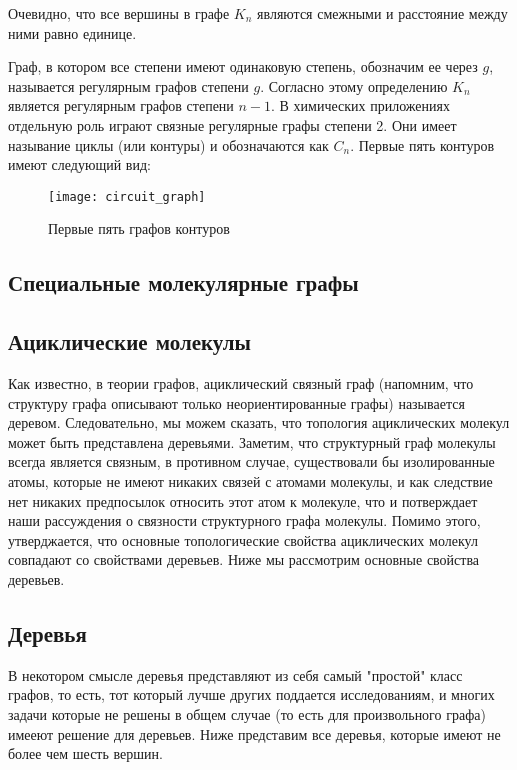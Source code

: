 \documentclass{article}
\begin{document}
Очевидно, что все вершины в графе $K_n$ являются смежными и расстояние между ними равно единице.

Граф, в котором все степени имеют одинаковую степень, обозначим ее через $g$, называется регулярным графов степени $g$. Согласно этому определению $K_n$ является регулярным графов степени $n-1$. В химических приложениях отдельную роль играют связные регулярные графы степени 2. Они имеет называние циклы (или контуры) и обозначаются как $C_n$. Первые пять контуров имеют следующий вид:


\begin{figure}[h]
\texttt{[image: circuit\_graph]}
\centering
\caption{Первые пять графов контуров}
\end{figure}



\newpage

\subsection{Специальные молекулярные графы} 

\subsection{Ациклические молекулы}

Как известно, в теории графов, ациклический связный граф (напомним, что структуру графа описывают только неориентированные графы) называется деревом. Следовательно, мы можем сказать, что топология ациклических молекул может быть представлена деревьями. Заметим, что структурный граф молекулы всегда является связным, в противном случае, существовали бы изолированные атомы, которые не имеют никаких связей с атомами молекулы, и как следствие нет никаких предпосылок относить этот атом к молекуле, что и потверждает наши рассуждения о связности структурного графа молекулы. Помимо этого, утверджается, что основные топологические свойства ациклических молекул совпадают со свойствами деревьев. Ниже мы рассмотрим основные свойства деревьев.

\subsection{Деревья}

В некотором смысле деревья представляют из себя самый "простой" класс графов, то есть, тот который лучше других поддается исследованиям, и многих задачи которые не решены в общем случае (то есть для произвольного графа) имееют решение для деревьев. Ниже представим все деревья, которые имеют не более чем шесть вершин.
\end{document}
